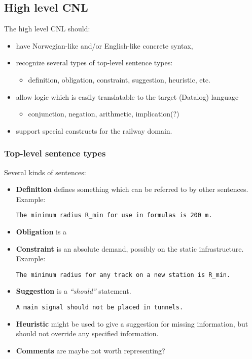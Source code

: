 \documentclass[]{article}
\providecommand{\tightlist}{%
  \setlength{\itemsep}{0pt}\setlength{\parskip}{0pt}}
\begin{document}
\subsection{High level CNL}\label{high-level-cnl}

The high level CNL should:

\begin{itemize}
\tightlist
\item
  have Norwegian-like and/or English-like concrete syntax,
\item
  recognize several types of top-level sentence types:

  \begin{itemize}
  \tightlist
  \item
    definition, obligation, constraint, suggestion, heuristic, etc.
  \end{itemize}
\item
  allow logic which is easily translatable to the target (Datalog)
  language

  \begin{itemize}
  \tightlist
  \item
    conjunction, negation, arithmetic, implication(?)
  \end{itemize}
\item
  support special constructs for the railway domain.
\end{itemize}

\subsubsection{Top-level sentence types}\label{top-level-sentence-types}

Several kinds of sentences:

\begin{itemize}
\item
  \textbf{Definition} defines something which can be referred to by
  other sentences. Example:

\begin{verbatim}
The minimum radius R_min for use in formulas is 200 m.
\end{verbatim}
\item
  \textbf{Obligation} is a
\item
  \textbf{Constraint} is an absolute demand, possibly on the static
  infrastructure. Example:

\begin{verbatim}
The minimum radius for any track on a new station is R_min.
\end{verbatim}
\item
  \textbf{Suggestion} is a \emph{``should''} statement.

\begin{verbatim}
A main signal should not be placed in tunnels.
\end{verbatim}
\item
  \textbf{Heuristic} might be used to give a suggestion for missing
  information, but should not override any specified information.
\item
  \textbf{Comments} are maybe not worth representing?
\end{itemize}
\end{document}
